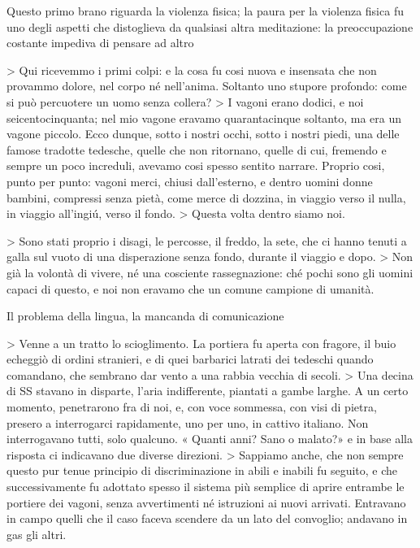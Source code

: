 Questo primo brano riguarda la violenza fisica; la paura per la violenza fisica fu uno degli aspetti che distoglieva da qualsiasi altra meditazione: la preoccupazione costante impediva di pensare ad altro

> Qui ricevemmo i primi colpi: e la cosa fu cosi nuova e insensata che non provammo dolore, nel corpo né nell'anima. Soltanto uno stupore profondo: come si può percuotere un uomo senza collera?
> I vagoni erano dodici, e noi seicentocinquanta; nel mio vagone eravamo quarantacinque soltanto, ma era un vagone piccolo. Ecco dunque, sotto i nostri occhi, sotto i nostri piedi, una delle famose tradotte tedesche, quelle che non ritornano, quelle di cui, fremendo e sempre un poco increduli, avevamo cosi spesso sentito narrare. Proprio cosi, punto per punto: vagoni merci, chiusi dall'esterno, e dentro uomini donne bambini, compressi senza pietà, come merce di dozzina, in viaggio verso il nulla, in viaggio all'ingiú, verso il fondo.
> Questa volta dentro siamo noi.

> Sono stati proprio i disagi, le percosse, il freddo, la sete, che ci hanno tenuti a galla sul vuoto di una disperazione senza fondo, durante il viaggio e dopo.
> Non già la volontà di vivere, né una cosciente rassegnazione: ché pochi sono gli uomini capaci di questo, e noi non eravamo che un comune campione di umanità.

Il problema della lingua, la mancanda di comunicazione

> Venne a un tratto lo scioglimento. La portiera fu aperta con fragore, il buio echeggiò di ordini stranieri, e di quei barbarici latrati dei tedeschi quando comandano, che sembrano dar vento a una rabbia vecchia di secoli.
> Una decina di SS stavano in disparte, l'aria indifferente, piantati a gambe larghe. A un certo momento, penetrarono fra di noi, e, con voce sommessa, con visi di pietra, presero a interrogarci rapidamente, uno per uno, in cattivo italiano. Non interrogavano tutti, solo qualcuno. « Quanti anni? Sano o malato?» e in base alla risposta ci indicavano due diverse direzioni.
> Sappiamo anche, che non sempre questo pur tenue principio di discriminazione in abili e inabili fu seguito, e che successivamente fu adottato spesso il sistema più semplice di aprire entrambe le portiere dei vagoni, senza avvertimenti né istruzioni ai nuovi arrivati. Entravano in campo quelli che il caso faceva scendere da un lato del convoglio; andavano in gas gli altri.

